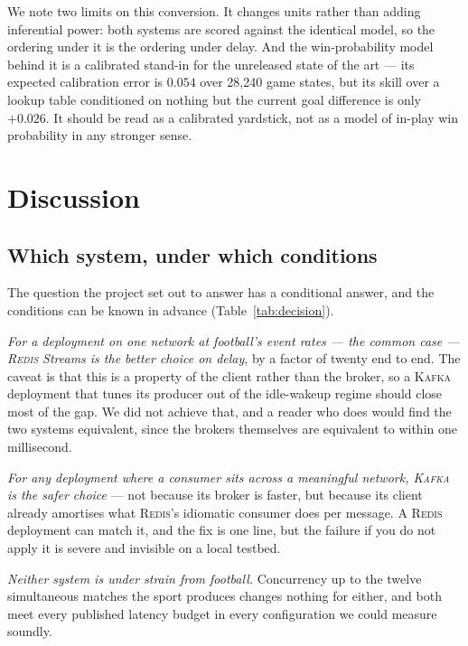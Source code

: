 \documentclass[Afour,sageh,times]{sagej}
\newcommand{\redis}{\textsc{Redis}}
\newcommand{\kafka}{\textsc{Kafka}}
\begin{document}
We note two limits on this conversion. It changes units rather than adding inferential power:
both systems are scored against the identical model, so the ordering under it is the ordering
under delay. And the win-probability model behind it is a calibrated stand-in for the unreleased
state of the art \cite{robberechts2021bayesian} --- its expected calibration error is $0.054$
over 28{,}240 game states, but its skill over a lookup table conditioned on nothing but the
current goal difference is only $+0.026$. It should be read as a calibrated yardstick, not as a
model of in-play win probability in any stronger sense.


\section{Discussion}
\label{sec:discussion}

\subsection{Which system, under which conditions}
\label{sec:which}

The question the project set out to answer has a conditional answer, and the conditions can be
known in advance (Table~\ref{tab:decision}).

\emph{For a deployment on one network at football's event rates --- the common case --- \redis{}
Streams is the better choice on delay}, by a factor of twenty end to end. The caveat is that this
is a property of the client rather than the broker, so a \kafka{} deployment that tunes its
producer out of the idle-wakeup regime should close most of the gap. We did not achieve that, and
a reader who does would find the two systems equivalent, since the brokers themselves are
equivalent to within one millisecond.

\emph{For any deployment where a consumer sits across a meaningful network, \kafka{} is the safer
choice} --- not because its broker is faster, but because its client already amortises what
\redis{}'s idiomatic consumer does per message. A \redis{} deployment can match it, and the fix is
one line, but the failure if you do not apply it is severe and invisible on a local testbed.

\emph{Neither system is under strain from football.} Concurrency up to the twelve simultaneous
matches the sport produces changes nothing for either, and both meet every published latency
budget in every configuration we could measure soundly.
\end{document}
